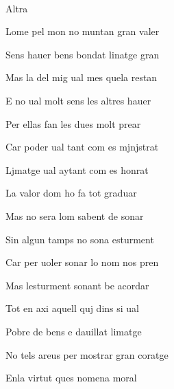 \documentclass[12pt]{article}
\renewcommand{\espaiAbansEtiquetaPoema}{\vspace{0ex}}
\begin{document}
\begin{estrofa}

\espaiAbansEtiquetaPoema

\\

\begin{rubrica}

Altra

\end{rubrica}
 
\end{estrofa}


\begin{estrofa}

 Lome pel mon no muntan gran valer

 Sens hauer bens bondat linatge gran

 Mas la del mig ual mes quela restan

 E no ual molt sens les altres hauer

 Per ellas fan les dues molt prear

 Car poder ual tant com es mjnjstrat

 Ljmatge ual aytant com es honrat

 La valor dom ho fa tot graduar

\end{estrofa}



\begin{estrofa}

 Mas no sera lom sabent de sonar

 Sin algun tamps no sona esturment

 Car per uoler sonar lo nom nos pren

 Mas lesturment sonant be acordar

 Tot en axi aquell quj dins si ual

 Pobre de bens e dauillat limatge

 No tels areus per mostrar gran coratge

 Enla virtut ques nomena moral

\end{estrofa}
\end{document}
